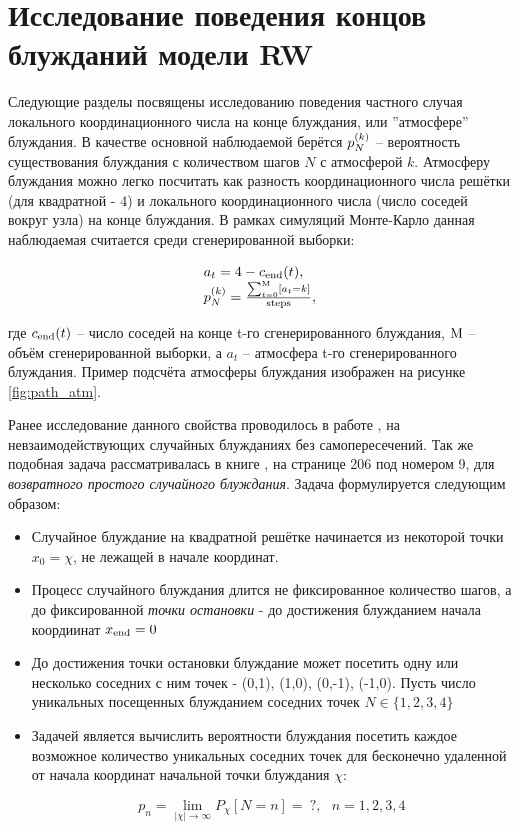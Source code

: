 \section{Исследование поведения концов блужданий модели RW}

Следующие разделы посвящены исследованию поведения частного случая локального координационного числа на конце блуждания, или ''атмосфере'' блуждания. 
В качестве основной наблюдаемой берётся $p^{(k)}_N$ -- вероятность существования блуждания с количеством шагов $N$ с атмосферой $k$.
Атмосферу блуждания можно легко посчитать как разность координационного числа решётки (для квадратной - 4) и локального координационного числа (число соседей вокруг узла) на конце блуждания.
В рамках симуляций Монте-Карло данная наблюдаемая считается среди сгенерированной выборки:

\begin{large}

\begin{equation}
\begin{array}{l}
a_t = 4 - c_{\textup{end}}(t), \\
p^{(k)}_N = \frac{\sum_{t=0}^{\textup{M}} [a_t = k]}{\textup{steps}},
\label{eq:pkn}
\end{array}
\end{equation}

\end{large}
где $c_{\textup{end}}(t)$ -- число соседей на конце t-го сгенерированного блуждания, $\textup{M}$ -- объём сгенерированной выборки, а $a_t$ -- атмосфера t-го сгенерированного блуждания. Пример подсчёта атмосферы блуждания изображен на рисунке \ref{fig:path_atm}.

Ранее исследование данного свойства проводилось в работе \cite{owczarek2008scaling}, на невзаимодействующих случайных блужданиях без самопересечений. 
Так же подобная задача рассматривалась в книге \cite{Spitser1969}, на странице 206 под номером 9, для \textit{возвратного простого случайного блуждания}. Задача формулируется следующим образом:

\begin{itemize}
    \item Случайное блуждание на квадратной решётке начинается из некоторой точки $x_0 = \chi$, не лежащей в начале координат.
    \item Процесс случайного блуждания длится не фиксированное количество шагов, а до фиксированной \textit{точки остановки} - до достижения блужданием начала коордиинат $x_{\textup{end}} = 0$
    \item До достижения точки остановки блуждание может посетить одну или несколько соседних с ним точек - (0,1), (1,0), (0,-1), (-1,0). Пусть число уникальных посещенных блужданием соседних точек  $N \in \{1, 2, 3, 4\}$
    \item Задачей является вычислить вероятности блуждания посетить каждое возможное количество уникальных соседних точек для бесконечно удаленной от начала координат начальной точки блуждания $\chi$:
    
    \[ p_{n} = \lim_{|\chi|\to \infty} P_{\chi}[N = n] =\ ?,\ \ \ n = 1, 2, 3, 4\]
\end{itemize}

